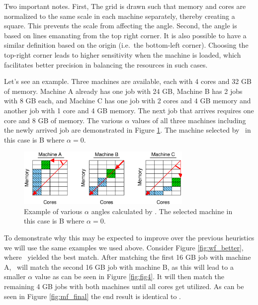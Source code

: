 Two important notes. First, The grid is drawn such that memory and
cores are normalized to the same scale in each machine separately, thereby
creating a square.
This prevents the scale from affecting the angle.
Second, the angle is based on lines emanating from the top right corner.
It is also possible to have a similar definition based on the origin
(i.e.\ the bottom-left corner).
Choosing the top-right corner leads to higher sensitivity when the
machine is loaded, which facilitates better precision in balancing the
resources in such cases.

Let's see an example. 
Three machines are available, each with 4 cores and 32 GB of memory.
Machine A already has one job with 24 GB, Machine B has 2 jobs
with 8 GB each, and Machine C has one job with 2 cores and 4 GB memory
and another job with 1 core and 4 GB memory.
The next job that arrives requires one core and 8 GB of memory.
The various $\alpha$ values of all three machines including the newly
arrived job are demonstrated in Figure \ref{fig:fig3}.
The machine selected by \mif\ in this case is B where
$\alpha=0$.

\begin{figure}\centering
	\includegraphics[width=0.75\textwidth]{figures/fig3.eps}
\caption{Example of various $\alpha$ angles calculated by \mif. The
selected machine in this case is B where $\alpha=0$.}
\label{fig:fig3}
\end{figure}

To demonstrate why this may be expected to improve over the previous
heuristics we will use the same examples we used above.
Consider Figure \ref{fig:wf_better}, where \wof\ yielded the best
match.
After matching the first 16 GB job with machine A, \mif\ will 
match the second 16 GB job with machine B, as this will lead to a
smaller $\alpha$ value as can be seen in Figure \ref{fig:fig4}.
It will then match the remaining 4 GB jobs with both machines
until all cores get utilized.
As can be seen in Figure \ref{fig:mf_final} the end result is identical
to \wof.

